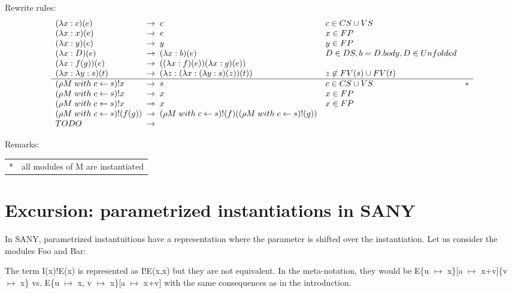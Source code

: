 \documentclass[a4paper]{article}
\newcommand{\tla}[1]{#1}
\begin{document}
Rewrite rules:\\

\[
\begin{array}{l@{\;\;\rightarrow\;\;}lll}
  (\lambda x : c)(e) &  c & c \in CS \cup VS & \\
  (\lambda x : x)(e) &  e & x \in FP &\\
  (\lambda x : y)(e) &  y & y \in FP&\\
  (\lambda x : D)(e) &  (\lambda x : b)(e) & D \in DS, b = D.body,
                                             D \in Unfolded&\\
  (\lambda x : f(g))(e) & ((\lambda x : f)(e))(\lambda x : g)(e)) &\\
  (\lambda x : \lambda y : s)(t)
                     & (\lambda z : (\lambda x : (\lambda y : s)(z))(t))
                          & z \not \in FV(s) \cup FV(t) &\\
  \hline
  (\rho M\; with\; c \leftarrow s)! x & s & c \in CS \cup VS & * \\
  (\rho M\; with\; c \leftarrow s)! x & x & x \in FP &\\
  (\rho M\; with\; c \leftarrow s)! x & x & x \in FP &\\
  (\rho M\; with\; c \leftarrow s)!(f(g))
                     & (\rho M\; with\; c \leftarrow s)!(f)
                       ((\rho M\; with\; c \leftarrow s)!(g) ) &  &\\
  TODO
\end{array}
\]

Remarks:\\
\begin{tabular}{ll}
  * & all modules of M are instantiated \\
\end{tabular}

\section{Excursion: parametrized instantiations in SANY}
\label{sec:param-inst}

In SANY, parametrized instantuitions have a representation where the
 parameter is shifted over the instantiation. Let us consider the
 modules Foo and Bar:

\begin{parcolumns}{2}
\end{parcolumns}

The term \tla{I(x)!E(x)} is represented as \tla{I!E(x,x)} but they are
 not equivalent. In the meta-notation, they would be
 E\{u $\mapsto$ x\}[a $\mapsto$ x+v]\{v $\mapsto$ x\} vs. E\{u $\mapsto$ x,
 v $\mapsto$ x\}[a $\mapsto$ x+v] with the same consequences as in the
 introduction.
\end{document}
